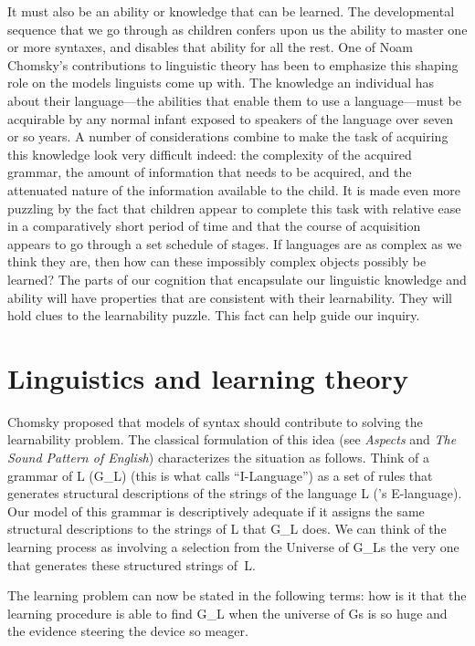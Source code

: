 It must also be an ability or knowledge that can be learned. The developmental sequence that we go through as children confers upon us the ability to master one or more syntaxes, and disables that ability for all the rest. One of Noam Chomsky's contributions to linguistic theory has been to emphasize this shaping role on the models linguists come up with. The knowledge an individual has about their language---the abilities that enable them to use a language---must be acquirable by any normal infant exposed to speakers of the language over seven or so years. A number of considerations combine to make the task of acquiring this knowledge look very difficult indeed: the complexity of the acquired grammar, the amount of information that needs to be acquired, and the attenuated nature of the information available to the child. It is made even more puzzling by the fact that children appear to complete this task with relative ease in a comparatively short period of time and that the course of acquisition appears to go through a set schedule of stages. If languages are as complex as we think they are, then how can these impossibly complex objects possibly be learned? The parts of our cognition that encapsulate our linguistic knowledge and ability will have properties that are consistent with their learnability. They will hold clues to the learnability puzzle. This fact can help guide our inquiry.
\medskip

\section{Linguistics and learning theory}

Chomsky proposed that models of syntax should contribute to solving the learnability problem. The classical formulation of this idea (see \emph{Aspects} and \emph{The Sound Pattern of English})\nocite{Chomsky:1968} characterizes the situation as follows. Think of a grammar of L (G_L) (this is what \citet{Chomsky:1986b} calls ``I-Language'') as a set of rules that generates structural descriptions of the strings of the language L (\citet{Chomsky:1986b}'s E-language). Our model of this grammar is descriptively adequate if it assigns the same structural descriptions to the strings of L that G_L does. We can think of the learning process as involving a selection from the Universe of G_Ls the very one that generates these structured strings of~L.

The learning problem can now be stated in the following terms: how is it that the learning procedure is able to find G_L when the universe of Gs is so huge and the evidence steering the device so meager.


